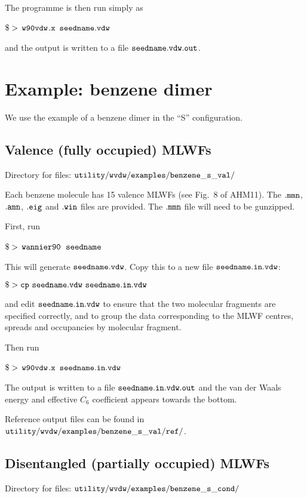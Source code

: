 \documentclass{report}
\newcommand{\wvdw}{{$\tt{w90vdw}$}}
\newcommand{\wannier}{{$\tt{wannier90}$}}
\begin{document}
The programme is then run simply as

$\tt{\$>}$ \wvdw$\tt{.x}$ $\tt{seedname.vdw}$

and the output is written to a file $\tt{seedname.vdw.out}$. 

\section{Example: benzene dimer}

We use the example of a benzene dimer in the ``S''
configuration.

\subsection{Valence (fully occupied) MLWFs}

Directory for files: $\tt{utility/wvdw/examples/benzene\_s\_val/}$

Each benzene molecule has 15 valence MLWFs (see Fig.~8 of AHM11).  The
$\tt{.mmn}$, $\tt{.amn}$, $\tt{.eig}$ and $\tt{.win}$ files are
provided. The $\tt{.mmn}$ file will need to be gunzipped.

First, run 

$\tt{\$>}$ \wannier\ $\tt{seedname}$

This will generate $\tt{seedname.vdw}$. Copy this to a new file
$\tt{seedname.in.vdw}$:

$\tt{\$> cp\ seedname.vdw\ seedname.in.vdw}$

and edit $\tt{seedname.in.vdw}$ to ensure that the two molecular
fragments are specified correctly, and to group the data corresponding
to the MLWF centres, spreads and occupancies by molecular fragment. 

Then run 

$\tt{\$>}$ \wvdw$\tt{.x}$ $\tt{seedname.in.vdw}$

The output is written to a file $\tt{seedname.in.vdw.out}$ and the van der Waals
energy and effective $C_6$ coefficient appears towards the bottom.

Reference output files can be found in  $\tt{utility/wvdw/examples/benzene\_s\_val/ref/}$.

\subsection{Disentangled (partially occupied) MLWFs}

Directory for files: $\tt{utility/wvdw/examples/benzene\_s\_cond/}$
\end{document}
